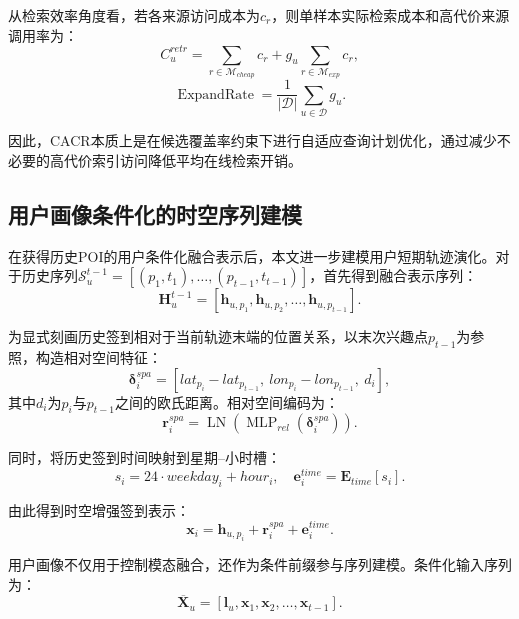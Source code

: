 \documentclass{rjthesis}
\begin{document}
从检索效率角度看，若各来源访问成本为$c_r$，则单样本实际检索成本和高代价来源调用率为：
\begin{equation}
C_u^{retr}=\sum_{r\in\mathcal M_{cheap}}c_r+g_u\sum_{r\in\mathcal M_{exp}}c_r,
\end{equation}
\begin{equation}
\operatorname{ExpandRate}=\frac{1}{|\mathcal D|}\sum_{u\in\mathcal D}g_u.
\end{equation}

因此，CACR本质上是在候选覆盖率约束下进行自适应查询计划优化，通过减少不必要的高代价索引访问降低平均在线检索开销。

\subsection{用户画像条件化的时空序列建模}

在获得历史POI的用户条件化融合表示后，本文进一步建模用户短期轨迹演化。对于历史序列$\mathcal S_u^{t-1}=[(p_1,t_1),\ldots,(p_{t-1},t_{t-1})]$，首先得到融合表示序列：
\begin{equation}
\mathbf H_u^{t-1}=[\mathbf h_{u,p_1},\mathbf h_{u,p_2},\ldots,\mathbf h_{u,p_{t-1}}].
\end{equation}

为显式刻画历史签到相对于当前轨迹末端的位置关系，以末次兴趣点$p_{t-1}$为参照，构造相对空间特征：
\begin{equation}
\boldsymbol\delta_i^{spa}=[lat_{p_i}-lat_{p_{t-1}},\ lon_{p_i}-lon_{p_{t-1}},\ d_i],
\end{equation}
其中$d_i$为$p_i$与$p_{t-1}$之间的欧氏距离。相对空间编码为：
\begin{equation}
\mathbf r_i^{spa}=\operatorname{LN}(\operatorname{MLP}_{rel}(\boldsymbol\delta_i^{spa})).
\end{equation}

同时，将历史签到时间映射到星期--小时槽：
\begin{equation}
s_i=24\cdot weekday_i+hour_i,\quad \mathbf e_i^{time}=\mathbf E_{time}[s_i].
\end{equation}

由此得到时空增强签到表示：
\begin{equation}
\mathbf x_i=\mathbf h_{u,p_i}+\mathbf r_i^{spa}+\mathbf e_i^{time}.
\end{equation}

用户画像不仅用于控制模态融合，还作为条件前缀参与序列建模。条件化输入序列为：
\begin{equation}
\overline{\mathbf X}_u=[\mathbf l_u,\mathbf x_1,\mathbf x_2,\ldots,\mathbf x_{t-1}].
\end{equation}
\end{document}
